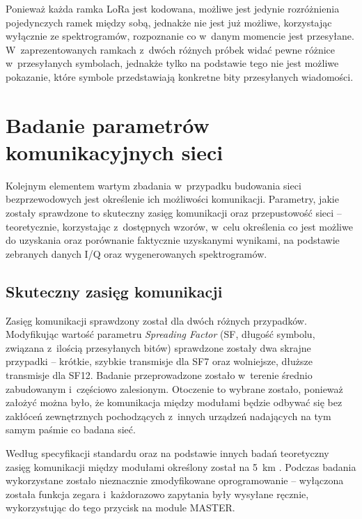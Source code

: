 Ponieważ każda ramka LoRa jest kodowana, możliwe jest jedynie rozróżnienia pojedynczych ramek między sobą, jednakże nie
jest już możliwe, korzystając wyłącznie ze spektrogramów, rozpoznanie co w~danym momencie jest przesyłane.
W~zaprezentowanych ramkach z~dwóch różnych próbek widać pewne różnice w~przesyłanych symbolach, jednakże tylko na
podstawie tego nie jest możliwe pokazanie, które symbole przedstawiają konkretne bity przesyłanych wiadomości.

\FloatBarrier

\section{\label{sect:network-communication-params}Badanie parametrów komunikacyjnych sieci} Kolejnym elementem wartym
zbadania w~przypadku budowania sieci bezprzewodowych jest określenie ich możliwości komunikacji. Parametry, jakie
zostały sprawdzone to skuteczny zasięg komunikacji oraz przepustowość sieci -- teoretycznie, korzystając z~dostępnych
wzorów, w~celu określenia co jest możliwe do uzyskania oraz porównanie faktycznie uzyskanymi wynikami, na podstawie
zebranych danych I/Q oraz wygenerowanych spektrogramów.

\subsection{\label{sect:network-communication-range}Skuteczny zasięg komunikacji} Zasięg komunikacji sprawdzony został
dla dwóch różnych przypadków. Modyfikując wartość parametru \textsl{Spreading Factor} (SF, długość symbolu, związana z~ilością
przesyłanych bitów) sprawdzone zostały dwa skrajne przypadki -- krótkie, szybkie transmisje dla SF7 oraz wolniejsze,
dłuższe transmisje dla SF12. Badanie przeprowadzone zostało w~terenie średnio zabudowanym i~częściowo zalesionym.
Otoczenie to wybrane zostało, ponieważ założyć można było, że komunikacja między modułami będzie odbywać się bez
zakłóceń zewnętrznych pochodzących z~innych urządzeń nadających na tym samym paśmie co badana sieć.

Według specyfikacji standardu oraz na podstawie innych badań teoretyczny zasięg komunikacji między modułami określony
został na 5~km \cite{lora-phy-range-test}. Podczas badania wykorzystane zostało nieznacznie zmodyfikowane oprogramowanie
-- wyłączona została funkcja zegara i~każdorazowo zapytania były wysyłane ręcznie, wykorzystując do tego przycisk na
module MASTER.

